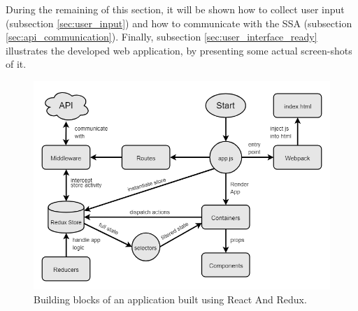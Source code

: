 
During the remaining of this section, it will be shown how to collect user input (subsection \ref{sec:user_input}) and how to communicate with the SSA  (subsection \ref{sec:api_communication}). Finally, subsection \ref{sec:user_interface_ready} illustrates the developed web application, by presenting some actual screen-shots of it.

\begin{figure}[htpb]
  \centering
  \includegraphics[width=.8\textwidth]{./Figures/system_implementation/react_redux_app.png}
  \caption{Building blocks of an application built using React And Redux.}
  \label{fig:react_redux_app}  
\end{figure}


